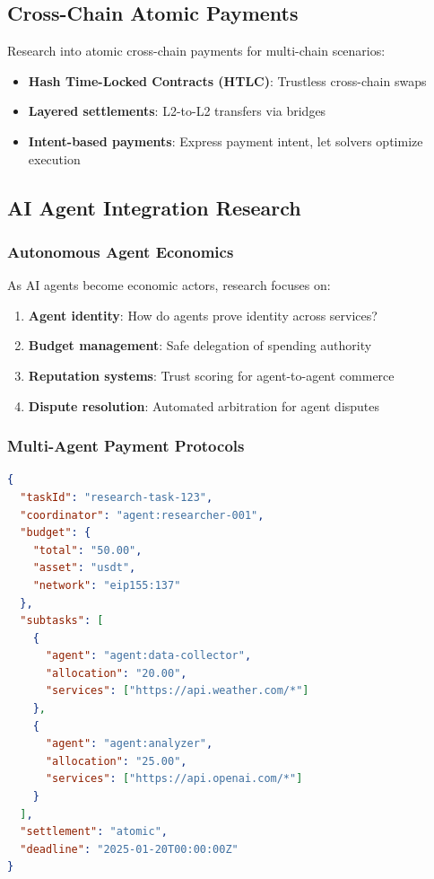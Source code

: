 \subsection{Cross-Chain Atomic Payments}

Research into atomic cross-chain payments for multi-chain scenarios:

\begin{itemize}
    \item \textbf{Hash Time-Locked Contracts (HTLC)}: Trustless cross-chain swaps
    \item \textbf{Layered settlements}: L2-to-L2 transfers via bridges
    \item \textbf{Intent-based payments}: Express payment intent, let solvers optimize execution
\end{itemize}

\subsection{AI Agent Integration Research}

\subsubsection{Autonomous Agent Economics}

As AI agents become economic actors, research focuses on:

\begin{enumerate}
    \item \textbf{Agent identity}: How do agents prove identity across services?
    \item \textbf{Budget management}: Safe delegation of spending authority
    \item \textbf{Reputation systems}: Trust scoring for agent-to-agent commerce
    \item \textbf{Dispute resolution}: Automated arbitration for agent disputes
\end{enumerate}

\subsubsection{Multi-Agent Payment Protocols}

\begin{lstlisting}[language=json, caption={Multi-Agent Payment Coordination}]
{
  "taskId": "research-task-123",
  "coordinator": "agent:researcher-001",
  "budget": {
    "total": "50.00",
    "asset": "usdt",
    "network": "eip155:137"
  },
  "subtasks": [
    {
      "agent": "agent:data-collector",
      "allocation": "20.00",
      "services": ["https://api.weather.com/*"]
    },
    {
      "agent": "agent:analyzer",
      "allocation": "25.00",
      "services": ["https://api.openai.com/*"]
    }
  ],
  "settlement": "atomic",
  "deadline": "2025-01-20T00:00:00Z"
}
\end{lstlisting}

